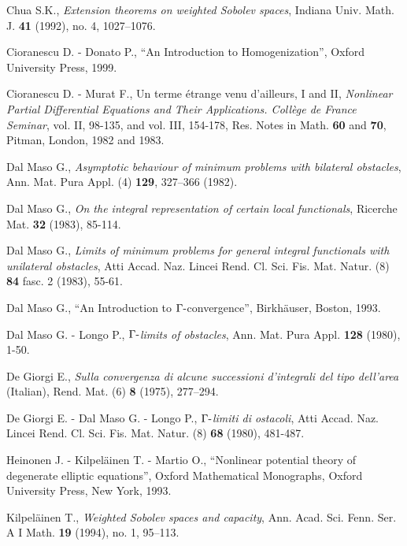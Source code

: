 \documentclass[10pt,reqno]{amsart}
\numberwithin{equation}{section}
\begin{document}
\begin{thebibliography}{99}
 {\rm Chua S.K.}, {\it Extension theorems on weighted
Sobolev spaces},  Indiana Univ. Math. J. {\bf 41} (1992), no. 4,
1027--1076.

 {\rm Cioranescu D. - Donato P.}, {``An Introduction to
Homogenization''}, %
Oxford University Press, 1999.

 {\rm Cioranescu D. - Murat F.}, {\rm Un terme \'etrange venu
d'ailleurs, I and II}, {\it Nonlinear  Partial Differential Equations
and Their Applications. Coll\`ege de France Seminar}, vol. II, 98-135,
and vol. III, 154-178, Res. Notes in Math. {\bf 60} and {\bf 70}, Pitman,
London, 1982 and 1983.

 {\rm Dal Maso G.}, {\it Asymptotic behaviour of minimum
problems with bilateral obstacles},  Ann. Mat. Pura Appl. (4) {\bf 129},
327--366 (1982).

 {\rm Dal Maso G.}, {\it On the integral representation of
certain local functionals}, Ricerche Mat. {\bf 32} (1983), 85-114.

 {\rm Dal Maso G.}, {\it Limits of minimum problems for general
integral functionals with unilateral obstacles}, Atti Accad. Naz. Lincei
Rend. Cl. Sci. Fis. Mat. Natur. (8) {\bf 84} fasc. 2 (1983), 55-61.

 {\rm Dal Maso G.,} {``An Introduction to
$\Gamma\hbox{-}$convergence''}, Birkh\"auser, Boston, 1993.

 {\rm Dal Maso G. - Longo P.},
{\it $\Gamma\hbox{-}$limits of obstacles}, Ann. Mat. Pura Appl.
{\bf 128} (1980), 1-50.

 {\rm De Giorgi E.}, {\it Sulla convergenza di alcune
successioni d'integrali del tipo dell'area} (Italian),
Rend. Mat. (6) {\bf 8} (1975), 277--294.

 {\rm De Giorgi E. - Dal Maso G. - Longo P.},
{\it $\Gamma\hbox{-}$limiti di ostacoli}, Atti Accad. Naz. Lincei
Rend. Cl. Sci. Fis. Mat. Natur. (8) {\bf 68} (1980), 481-487.

 {\rm Heinonen J. - Kilpel\"ainen T. - Martio O.},
``Nonlinear potential theory of degenerate elliptic equations'',
Oxford Mathematical Monographs, %
Oxford University Press, New York, 1993.

 {\rm Kilpel\"ainen T.},
{\it Weighted Sobolev spaces and capacity},
 Ann. Acad. Sci. Fenn. Ser. A I Math. {\bf 19} (1994), no. 1, 95--113.


\end{thebibliography}
\end{document}
